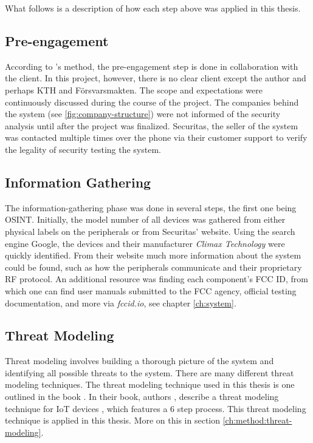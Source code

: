 What follows is a description of how each step above was applied in this thesis.

\subsection{Pre-engagement}
According to \citeauthor{weidman2014}'s method, the pre-engagement step is done in collaboration with the client. In this project, however, there is no clear client except the author and perhaps KTH and Försvarsmakten. The scope and expectations were continuously discussed during the course of the project. The companies behind the system (see \ref{fig:company-structure}) were not informed of the security analysis until after the project was finalized. Securitas, the seller of the system was contacted multiple times over the phone via their customer support to verify the legality of security testing the system.

\subsection{Information Gathering}
The information-gathering phase was done in several steps, the first one being \gls{OSINT}. Initially, the model number of all devices was gathered from either physical labels on the peripherals or from Securitas' website. Using the search engine Google, the devices and their manufacturer \textit{Climax Technology} were quickly identified. From their website much more information about the system could be found, such as how the peripherals communicate and their proprietary \gls{RF} protocol. An additional resource was finding each component's FCC ID, from which one can find user manuals submitted to the FCC agency, official testing documentation, and more via \textit{fccid.io}, see chapter \ref{ch:system}.

\subsection{Threat Modeling}
Threat modeling involves building a thorough picture of the system and identifying all possible threats to the system. There are many different threat modeling techniques. The threat modeling technique used in this thesis is one outlined in the book . In their book, authors \citeauthor{guzman2017iot}, describe a threat modeling technique for IoT devices \citeauthor{guzman2017iot}, which features a 6 step process. This threat modeling technique is applied in this thesis. More on this in section \ref{ch:method:threat-modeling}.

